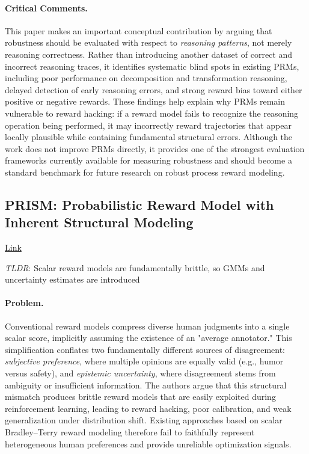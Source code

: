 \documentclass[11pt]{article}
\begin{document}
\paragraph{Critical Comments.}
This paper makes an important conceptual contribution by arguing that robustness should be evaluated with respect to \emph{reasoning patterns}, not merely reasoning correctness. Rather than introducing another dataset of correct and incorrect reasoning traces, it identifies systematic blind spots in existing PRMs, including poor performance on decomposition and transformation reasoning, delayed detection of early reasoning errors, and strong reward bias toward either positive or negative rewards. These findings help explain why PRMs remain vulnerable to reward hacking: if a reward model fails to recognize the reasoning operation being performed, it may incorrectly reward trajectories that appear locally plausible while containing fundamental structural errors. Although the work does not improve PRMs directly, it provides one of the strongest evaluation frameworks currently available for measuring robustness and should become a standard benchmark for future research on robust process reward modeling.

\subsection{PRISM: Probabilistic Reward Model with Inherent Structural Modeling}

\href{https://aclanthology.org/2026.acl-long.563.pdf}{Link}

\emph{TLDR}: Scalar reward models are fundamentally brittle, so GMMs and uncertainty estimates are introduced

\paragraph{Problem.}
Conventional reward models compress diverse human judgments into a single scalar score, implicitly assuming the existence of an "average annotator." This simplification conflates two fundamentally different sources of disagreement: \emph{subjective preference}, where multiple opinions are equally valid (e.g., humor versus safety), and \emph{epistemic uncertainty}, where disagreement stems from ambiguity or insufficient information. The authors argue that this structural mismatch produces brittle reward models that are easily exploited during reinforcement learning, leading to reward hacking, poor calibration, and weak generalization under distribution shift. Existing approaches based on scalar Bradley--Terry reward modeling therefore fail to faithfully represent heterogeneous human preferences and provide unreliable optimization signals.  
\end{document}
